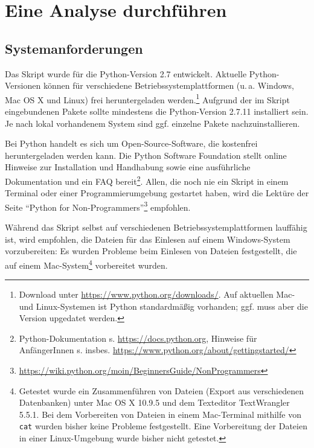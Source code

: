 \section{Eine Analyse durchführen}
\label{analysis}

\subsection{Systemanforderungen}
\label{requirements}
Das Skript wurde für die Python-Version 2.7 entwickelt. Aktuelle Python-Versionen können für verschiedene Betriebssystemplattformen (u.\,a. Windows, Mac OS X und Linux) frei heruntergeladen werden.\footnote{Download unter \url{https://www.python.org/downloads/}. Auf aktuellen Mac- und Linux-Systemen ist Python standardmäßig vorhanden; ggf. muss aber die Version upgedatet werden.} Aufgrund der im Skript eingebundenen Pakete sollte mindestens die Python-Version 2.7.11 installiert sein. Je nach lokal vorhandenem System sind ggf. einzelne Pakete nachzuinstallieren.

Bei Python handelt es sich um Open-Source-Software, die kostenfrei heruntergeladen werden kann. Die Python Software Foundation stellt online Hinweise zur Installation und Hand\-habung sowie eine ausführliche Dokumentation und ein FAQ bereit\footnote{Python-Dokumentation s. \url{https://docs.python.org}, Hinweise für AnfängerInnen s. insbes. \url{https://www.python.org/about/gettingstarted/}}. Allen, die noch nie ein Skript in einem Terminal oder einer Programmierumgebung gestartet haben, wird die Lektüre der Seite "`Python for Non-Programmers"'\footnote{\url{https://wiki.python.org/moin/BeginnersGuide/NonProgrammers}} empfohlen.

Während das Skript selbst auf verschiedenen Betriebssystemplattformen lauffähig ist, wird empfohlen, die Dateien für das Einlesen auf einem Windows-System vorzubereiten: Es wurden Probleme beim Einlesen von Dateien festgestellt, die auf einem Mac-System\footnote{Getestet wurde ein Zusammenführen von Dateien (Export aus verschiedenen Datenbanken) unter Mac OS X 10.9.5 und dem Texteditor TextWrangler 5.5.1. Bei dem Vorbereiten von Dateien in einem Mac-Terminal mithilfe von \texttt{cat} wurden bisher keine Probleme festgestellt. Eine Vorbereitung der Dateien in einer Linux-Umgebung wurde bisher nicht getestet.} vorbereitet wurden.

